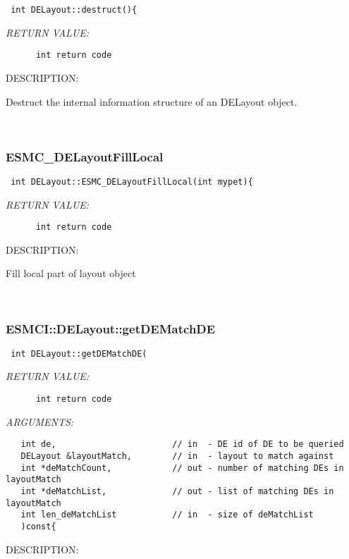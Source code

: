   
\begin{verbatim} int DELayout::destruct(){\end{verbatim}{\em RETURN VALUE:}
\begin{verbatim}      int return code\end{verbatim}
{\sf DESCRIPTION:\\ }


      Destruct the internal information structure of an DELayout object.
   
 
\mbox{}\hrulefill\
 
\subsubsection [ESMC\_DELayoutFillLocal] {ESMC\_DELayoutFillLocal}


  
\begin{verbatim} int DELayout::ESMC_DELayoutFillLocal(int mypet){\end{verbatim}{\em RETURN VALUE:}
\begin{verbatim}      int return code\end{verbatim}
{\sf DESCRIPTION:\\ }


      Fill local part of layout object
   
 
\mbox{}\hrulefill\
 
\subsubsection [ESMCI::DELayout::getDEMatchDE] {ESMCI::DELayout::getDEMatchDE}


  
\begin{verbatim} int DELayout::getDEMatchDE(\end{verbatim}{\em RETURN VALUE:}
\begin{verbatim}      int return code\end{verbatim}{\em ARGUMENTS:}
\begin{verbatim}   int de,                       // in  - DE id of DE to be queried
   DELayout &layoutMatch,        // in  - layout to match against
   int *deMatchCount,            // out - number of matching DEs in layoutMatch
   int *deMatchList,             // out - list of matching DEs in layoutMatch
   int len_deMatchList           // in  - size of deMatchList
   )const{\end{verbatim}
{\sf DESCRIPTION:\\ }


